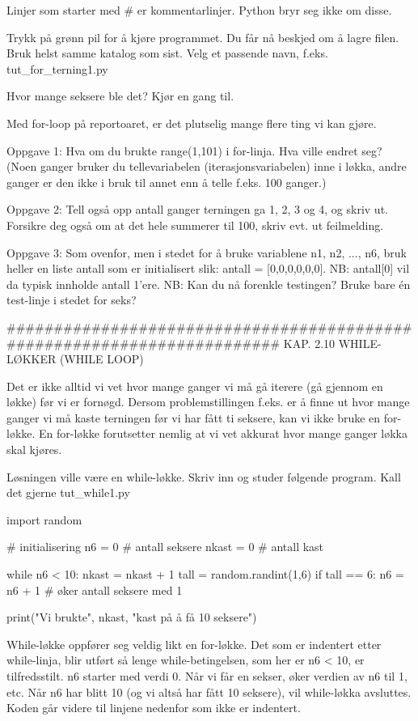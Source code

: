 Linjer som starter med # er kommentarlinjer. 
Python bryr seg ikke om disse. 

Trykk på grønn pil for å kjøre programmet.
Du får nå beskjed om å lagre filen. Bruk helst samme katalog som sist.
Velg et passende navn, f.eks. tut_for_terning1.py

Hvor mange seksere ble det?
Kjør en gang til.

Med for-loop på reportoaret, er det plutselig mange flere ting vi kan gjøre. 



Oppgave 1: Hva om du brukte range(1,101) i for-linja. Hva ville endret seg?
(Noen ganger bruker du tellevariabelen (iterasjonsvariabelen) inne i løkka,
andre ganger er den ikke i bruk til annet enn å telle f.eks. 100 ganger.) 


Oppgave 2: Tell også opp antall ganger terningen ga 1, 2, 3 og 4, og skriv ut.
Forsikre deg også om at det hele summerer til 100, skriv evt. ut feilmelding. 


Oppgave 3: Som ovenfor, men i stedet for å bruke variablene n1, n2, ..., n6,
bruk heller en liste antall som er initialisert slik: antall = [0,0,0,0,0,0].
NB: antall[0] vil da typisk innholde antall 1'ere. 
NB: Kan du nå forenkle testingen? Bruke bare én test-linje i stedet for seks? 

######################################################################## 
KAP. 2.10  WHILE-LØKKER (WHILE LOOP)

Det er ikke alltid vi vet hvor mange ganger vi må gå iterere (gå gjennom en løkke)
før vi er fornøgd.
Dersom problemstillingen f.eks. er å finne ut hvor mange ganger vi må kaste terningen
før vi har fått ti seksere, kan vi ikke bruke en for-løkke.
En for-løkke forutsetter nemlig at vi vet akkurat hvor mange ganger løkka skal kjøres.

Løsningen ville være en while-løkke.
Skriv inn og studer følgende program. Kall det gjerne tut_while1.py

import random

# initialisering
n6    = 0  # antall seksere
nkast = 0  # antall kast

while n6 < 10: 
    nkast = nkast + 1
    tall = random.randint(1,6)
    if tall == 6:
       n6 = n6 + 1    # øker antall seksere med 1
    
print("Vi brukte", nkast, "kast på å få 10 seksere")

While-løkke oppfører seg veldig likt en for-løkke. 
Det som er indentert etter while-linja, blir utført så lenge while-betingelsen,
som her er n6 < 10, er tilfredsstilt.
n6 starter med verdi 0.
Når vi får en sekser, øker verdien av n6 til 1, etc.
Når n6 har blitt 10 (og vi altså har fått 10 seksere), vil while-løkka avsluttes.
Koden går videre til linjene nedenfor som ikke er indentert. 





